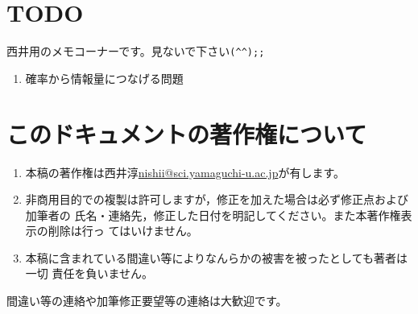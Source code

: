 \documentclass[twocolumn,11pt]{jarticle}
\begin{document}
\onecolumn
\pagestyle{plain}%

\appendix
\section{TODO}
西井用のメモコーナーです。見ないで下さい\verb|(^^);;|
\begin{enumerate}
\item 確率から情報量につなげる問題
\end{enumerate}%


\section{このドキュメントの著作権について}

\begin{enumerate}
\item 本稿の著作権は西井淳\url{nishii@sci.yamaguchi-u.ac.jp}が有します。
\item 非商用目的での複製は許可しますが，修正を加えた場合は必ず修正点および加筆者の
氏名・連絡先，修正した日付を明記してください。また本著作権表示の削除は行っ
てはいけません。
\item 本稿に含まれている間違い等によりなんらかの被害を被ったとしても著者は一切
責任を負いません。
\end{enumerate}
間違い等の連絡や加筆修正要望等の連絡は大歓迎です。



\printindex%
\end{document}

